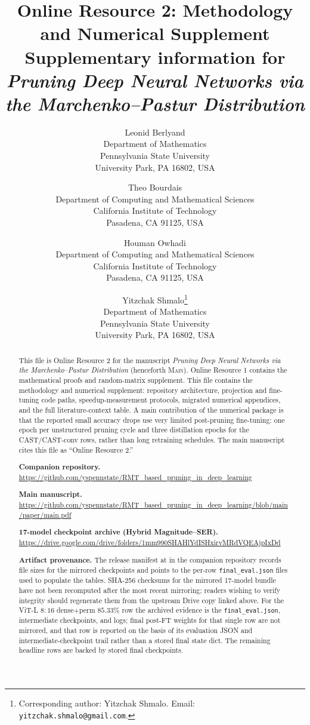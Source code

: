 \documentclass[11pt]{article}
\title{\textbf{Online Resource 2: Methodology and Numerical Supplement}\\[4pt]
  \large Supplementary information for \emph{Pruning Deep Neural Networks via the Marchenko--Pastur Distribution}}
\author{
    Leonid Berlyand \\
    {\small Department of Mathematics} \\
    {\small Pennsylvania State University} \\
    {\small University Park, PA 16802, USA}
    \and
    Theo Bourdais\\
    {\small Department of Computing and Mathematical Sciences} \\
    {\small California Institute of Technology} \\
    {\small Pasadena, CA 91125, USA}
    \and
    Houman Owhadi\\
    {\small Department of Computing and Mathematical Sciences} \\
    {\small California Institute of Technology} \\
    {\small Pasadena, CA 91125, USA}
    \and
    Yitzchak Shmalo\thanks{Corresponding author: Yitzchak Shmalo. Email: \texttt{yitzchak.shmalo@gmail.com}.} \\
    {\small Department of Mathematics} \\
    {\small Pennsylvania State University} \\
    {\small University Park, PA 16802, USA}
}
\date{}
\theoremstyle{plain}
\theoremstyle{definition}
\theoremstyle{remark}
\newcommand{\1}{\mathbf{1}}
\newcommand{\mainpaper}{\textsc{Main}}
\begin{document}
\maketitle

\begin{abstract}
This file is Online Resource 2 for the manuscript \emph{Pruning Deep Neural Networks via the Marchenko--Pastur Distribution} (henceforth \mainpaper{}). Online Resource 1 contains the mathematical proofs and random-matrix supplement. This file contains the methodology and numerical supplement: repository architecture, projection and fine-tuning code paths, speedup-measurement protocols, migrated numerical appendices, and the full literature-context table. A main contribution of the numerical package is that the reported small accuracy drops use very limited post-pruning fine-tuning: one epoch per unstructured pruning cycle and three distillation epochs for the CAST/CAST-conv rows, rather than long retraining schedules. The main manuscript cites this file as ``Online Resource 2.''

\medskip
\noindent\textbf{Companion repository.}\quad
\url{https://github.com/yspennstate/RMT_based_pruning_in_deep_learning}

\medskip
\noindent\textbf{Main manuscript.}\quad
\url{https://github.com/yspennstate/RMT_based_pruning_in_deep_learning/blob/main/paper/main.pdf}

\medskip
\noindent\textbf{17-model checkpoint archive (Hybrid Magnitude--SER).}\quad
\url{https://drive.google.com/drive/folders/1mm990SHAHlYdISHxirvMRdVQEAjpIxDd}

\medskip
\noindent\textbf{Artifact provenance.}\quad
The release manifest at  in the companion repository records file sizes for the mirrored checkpoints and points to the per-row \texttt{final\_eval.json} files used to populate the tables. SHA-256 checksums for the mirrored 17-model bundle have not been recomputed after the most recent mirroring; readers wishing to verify integrity should regenerate them from the upstream Drive copy linked above. For the ViT-L \(8{:}16\) dense+perm \(85.33\%\) row the archived evidence is the \texttt{final\_eval.json}, intermediate checkpoints, and logs; final post-FT weights for that single row are not mirrored, and that row is reported on the basis of its evaluation JSON and intermediate-checkpoint trail rather than a stored final state dict. The remaining headline rows are backed by stored final checkpoints.
\end{abstract}
\end{document}
